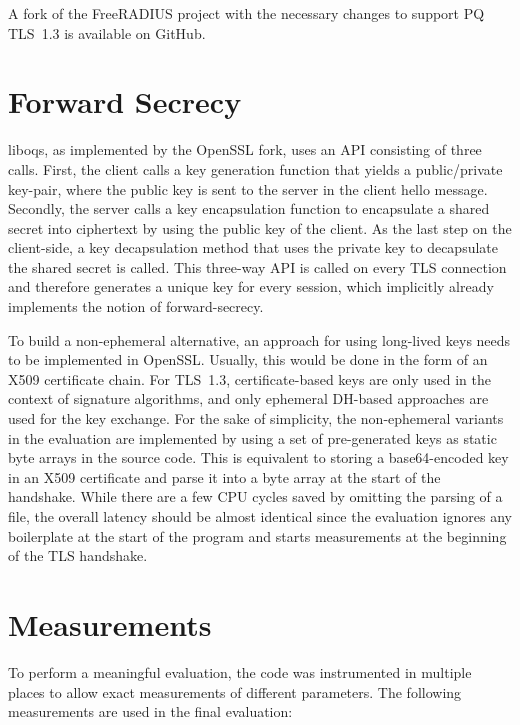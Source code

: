 A fork of the FreeRADIUS project with the necessary changes to support PQ TLS~1.3 is available on GitHub.

\section{Forward Secrecy}

liboqs, as implemented by the OpenSSL fork, uses an API consisting of three calls. First, the client calls a key generation function that yields a public/private key-pair, where the public key is sent to the server in the client hello message. Secondly, the server calls a key encapsulation function to encapsulate a shared secret into ciphertext by using the public key of the client. As the last step on the client-side, a key decapsulation method that uses the private key to decapsulate the shared secret is called. This three-way API is called on every TLS connection and therefore generates a unique key for every session, which implicitly already implements the notion of forward-secrecy.

To build a non-ephemeral alternative, an approach for using long-lived keys needs to be implemented in OpenSSL. Usually, this would be done in the form of an X509 certificate chain. For TLS~1.3, certificate-based keys are only used in the context of signature algorithms, and only ephemeral DH-based approaches are used for the key exchange. For the sake of simplicity, the non-ephemeral variants in the evaluation are implemented by using a set of pre-generated keys as static byte arrays in the source code. This is equivalent to storing a base64-encoded key in an X509 certificate and parse it into a byte array at the start of the handshake. While there are a few \acs{CPU} cycles saved by omitting the parsing of a file, the overall latency should be almost identical since the evaluation ignores any boilerplate at the start of the program and starts measurements at the beginning of the TLS handshake.

\section{Measurements}

To perform a meaningful evaluation, the code was instrumented in multiple places to allow exact measurements of different parameters. The following measurements are used in the final evaluation:

